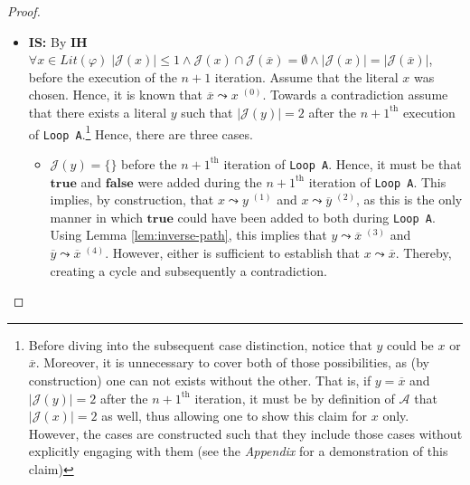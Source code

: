 \documentclass [11pt]{article}
\newcommand{\True}{\mathbf{true}}
\newcommand{\False}{\mathbf{false}}
\newcommand{\reach}{\leadsto}
\begin{document}
\begin{proof}
\begin{itemize}
\item \textbf{IS:} By \textbf{IH}  $\forall x \in \mathit{Lit}(\varphi)\; |\mathcal{J}(x)|\leq 1 \land \mathcal{J}(x) \cap \mathcal{J}(\overline{x}) = \emptyset \land |\mathcal{J}(x)| = |\mathcal{J}(\overline{x})|$,
before the execution of the $n+1$ iteration. Assume that the literal $x$ was chosen. Hence, it is known that $\overline{x} \reach x\;^{(0)}$. Towards a contradiction assume that there exists a literal $y$ such that $|\mathcal{J}(y)|=2$ after the $n+1^{\text{th}}$ execution of \texttt{Loop A}.\footnote{Before diving into the subsequent case distinction, notice that $y$ could be $x$ or $\overline{x}$. Moreover, it is unnecessary to cover both of those possibilities, as (by construction) one can not exists without the other.  That is, if $y=\overline{x}$ and $|\mathcal{J}(y)|=2$ after the  $n+1^{\text{th}}$ iteration, it must be by definition of $\mathcal{A}$ that  $|\mathcal{J}(x)|=2$ as well, thus allowing one to show this claim for $x$ only. However, the cases are constructed such that they include those cases without explicitly engaging with them (see the \emph{Appendix }for a demonstration of this claim)}
Hence, there are three cases. 
\begin{itemize}
\item $\mathcal{J}(y)=\{\}$ before the $n+1^{\text{th}}$ iteration of \texttt{Loop A}. Hence, it must be that $\True$ and $\False$  were added during the $n+1^{\text{th}}$ iteration of \texttt{Loop A}. This implies, by construction, that $x \reach y\; ^{(1)}$ and $x \reach \overline{y}\; ^{(2)}$, as this is the only manner in which $\True$ could have been added to both during \texttt{Loop A}. Using Lemma \ref{lem:inverse-path}, this implies that $y \reach \overline{x}\;^{(3)}$ and $\overline{y} \reach \overline{x}\;^{(4)}$. However, either is sufficient to establish that $x \reach \overline{x}$. Thereby, creating a cycle and subsequently a contradiction. 

\begin{center}
\end{center}
\end{itemize}
\end{itemize}
\end{proof}
\end{document}
